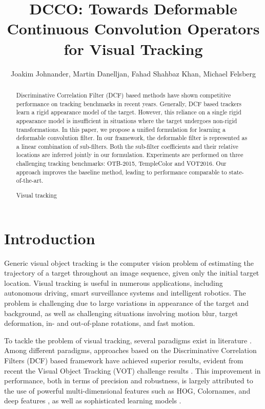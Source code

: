 \documentclass[runningheads,a4paper]{llncs}
\title{DCCO: Towards Deformable Continuous Convolution Operators for Visual Tracking}
\author{Joakim Johnander, Martin Danelljan, Fahad Shahbaz Khan, Michael Felsberg}
\institute{Computer Vision Laboratory, Dept.\ of Electrical Engineering, Link\"{o}ping University}
\newcommand{\keywords}[1]{\par\addvspace\baselineskip
	\noindent\keywordname\enspace\ignorespaces#1}
\begin{document}

\mainmatter  %

\maketitle

\begin{abstract}
Discriminative Correlation Filter (DCF) based methods have shown competitive performance on tracking benchmarks in recent years. Generally, DCF based trackers learn a rigid appearance model of the target. However, this reliance on a single rigid appearance model is insufficient in situations where the target undergoes non-rigid transformations. In this paper, we propose a unified formulation for learning a deformable convolution filter. In our framework, the deformable filter is represented as a linear combination of sub-filters. Both the sub-filter coefficients and their relative locations are inferred jointly in our formulation. Experiments are performed on three challenging tracking benchmarks: OTB-2015, TempleColor and VOT2016. Our approach improves the baseline method, leading to performance comparable to state-of-the-art.

  

\keywords{Visual tracking}
\end{abstract}\section{Introduction}
Generic visual object tracking is the computer vision problem of estimating the trajectory of a target throughout an image sequence, given only the initial target location. Visual tracking is useful in numerous applications, including autonomous driving, smart surveillance systems and intelligent robotics. The problem is challenging due to large variations in appearance of the target and background, as well as challenging situations involving motion blur, target deformation, in- and out-of-plane rotations, and fast motion.

To tackle the problem of visual tracking, several paradigms exist in literature \cite{VOT2016}. Among different paradigms, approaches based on the Discriminative Correlation Filters (DCF) based framework have achieved superior results, evident from recent the Visual Object Tracking (VOT) challenge results \cite{VOT2015}\cite{VOT2016}. This improvement in performance, both in terms of precision and robustness, is largely attributed to the use of powerful multi-dimensional features such as HOG, Colornames, and deep features \cite{DanelljanCVPR2016a}\cite{HCF_ICCV15}\cite{DanelljanCVPR14}, as well as sophisticated learning models \cite{DanelljanICCV2015}\cite{DanelljanECCV2016}.
\end{document}
